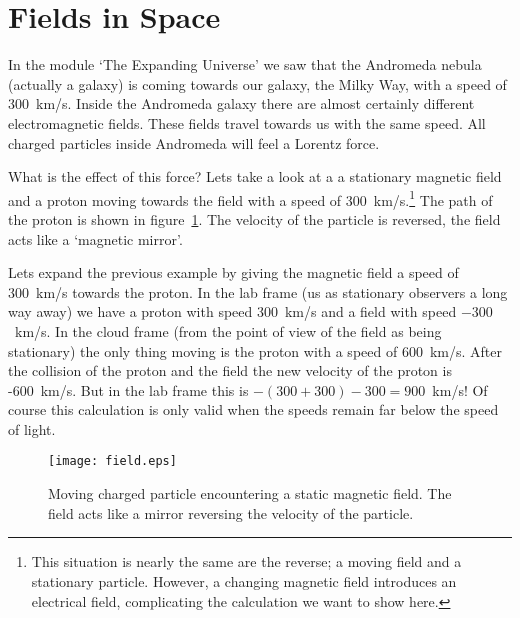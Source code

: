 \section{Fields in Space}
In the module `The Expanding Universe' we saw that the Andromeda nebula (actually a galaxy) is coming towards our galaxy, the Milky Way, with a speed of 300~km/s. Inside the Andromeda galaxy there are almost certainly different electromagnetic fields. These fields travel towards us with the same speed. All charged particles inside Andromeda will feel a Lorentz force.

What is the effect of this force? Lets take a look at a a stationary magnetic field and a proton moving towards the field with a speed of 300~km/s.\footnote{This situation is nearly the same are the reverse; a moving field and a stationary particle. However, a changing magnetic field introduces an electrical field, complicating the calculation we want to show here.} The path of the proton is shown in figure~\ref{fig:field}. The velocity of the particle is reversed, the field acts like a `magnetic mirror'.

Lets expand the previous example by giving the magnetic field a speed of 300~km/s towards the proton. In the lab frame (us as stationary observers a long way away) we have a proton with speed 300~km/s and a field with speed $-300$~km/s. In the cloud frame (from the point of view of the field as being stationary) the only thing moving is the proton with a speed of 600~km/s. After the collision of the proton and the field the new velocity of the proton is -600~km/s. But in the lab frame this is $-(300+300)-300 = 900$~km/s! Of course this calculation is only valid when the speeds remain far below the speed of light.

\begin{figure}\begin{center}
\texttt{[image: field.eps]}%
\caption{Moving charged particle encountering a static magnetic field. The field acts like a mirror reversing the velocity of the particle.}\label{fig:field}
\end{center}\end{figure}


